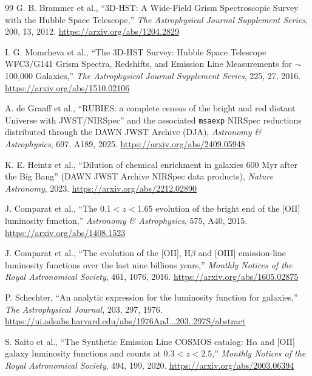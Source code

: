 \begin{thebibliography}{99}
G. B. Brammer et al.,
``3D-HST: A Wide-Field Grism Spectroscopic Survey with the Hubble Space Telescope,''
\emph{The Astrophysical Journal Supplement Series}, 200, 13, 2012.
\url{https://arxiv.org/abs/1204.2829}

I. G. Momcheva et al.,
``The 3D-HST Survey: Hubble Space Telescope WFC3/G141 Grism Spectra, Redshifts, and Emission Line Measurements for $\sim$100,000 Galaxies,''
\emph{The Astrophysical Journal Supplement Series}, 225, 27, 2016.
\url{https://arxiv.org/abs/1510.02106}

A. de Graaff et al.,
``RUBIES: a complete census of the bright and red distant Universe with JWST/NIRSpec'' and the associated \texttt{msaexp} NIRSpec reductions distributed through the DAWN JWST Archive (DJA),
\emph{Astronomy \& Astrophysics}, 697, A189, 2025.
\url{https://arxiv.org/abs/2409.05948}

K. E. Heintz et al.,
``Dilution of chemical enrichment in galaxies 600 Myr after the Big Bang'' (DAWN JWST Archive NIRSpec data products),
\emph{Nature Astronomy}, 2023.
\url{https://arxiv.org/abs/2212.02890}

J. Comparat et al.,
``The 0.1$<z<$1.65 evolution of the bright end of the [OII] luminosity function,''
\emph{Astronomy \& Astrophysics}, 575, A40, 2015.
\url{https://arxiv.org/abs/1408.1523}

J. Comparat et al.,
``The evolution of the [OII], H$\beta$ and [OIII] emission-line luminosity functions over the last nine billions years,''
\emph{Monthly Notices of the Royal Astronomical Society}, 461, 1076, 2016.
\url{https://arxiv.org/abs/1605.02875}

P. Schechter,
``An analytic expression for the luminosity function for galaxies,''
\emph{The Astrophysical Journal}, 203, 297, 1976.
\url{https://ui.adsabs.harvard.edu/abs/1976ApJ...203..297S/abstract}

S. Saito et al.,
``The Synthetic Emission Line COSMOS catalog: H$\alpha$ and [OII] galaxy luminosity functions and counts at $0.3<z<2.5$,''
\emph{Monthly Notices of the Royal Astronomical Society}, 494, 199, 2020.
\url{https://arxiv.org/abs/2003.06394}


\end{thebibliography}
